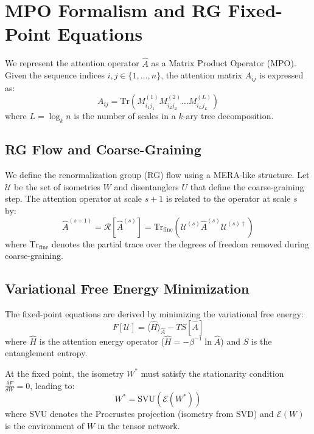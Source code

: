 
\section{MPO Formalism and RG Fixed-Point Equations}

We represent the attention operator $\hat{A}$ as a Matrix Product Operator (MPO). Given the sequence indices $i, j \in \{1, \dots, n\}$, the attention matrix $A_{ij}$ is expressed as:
\begin{equation}
    A_{ij} = \text{Tr} \left( M^{(1)}_{i_1 j_1} M^{(2)}_{i_2 j_2} \dots M^{(L)}_{i_L j_L} \right)
\end{equation}
where $L = \log_k n$ is the number of scales in a $k$-ary tree decomposition.

\subsection{RG Flow and Coarse-Graining}

We define the renormalization group (RG) flow using a MERA-like structure. Let $\mathcal{U}$ be the set of isometries $W$ and disentanglers $U$ that define the coarse-graining step. The attention operator at scale $s+1$ is related to the operator at scale $s$ by:
\begin{equation}
    \hat{A}^{(s+1)} = \mathcal{R}[\hat{A}^{(s)}] = \text{Tr}_{\text{fine}} \left( \mathcal{U}^{(s)} \hat{A}^{(s)} \mathcal{U}^{(s)\dagger} \right)
\end{equation}
where $\text{Tr}_{\text{fine}}$ denotes the partial trace over the degrees of freedom removed during coarse-graining.

\subsection{Variational Free Energy Minimization}

The fixed-point equations are derived by minimizing the variational free energy:
\begin{equation}
    F[\mathcal{U}] = \langle \hat{H} \rangle_{\hat{A}} - T S[\hat{A}]
\end{equation}
where $\hat{H}$ is the attention energy operator ($\hat{H} = -\beta^{-1} \ln \hat{A}$) and $S$ is the entanglement entropy.

At the fixed point, the isometry $W^*$ must satisfy the stationarity condition $\frac{\delta F}{\delta W} = 0$, leading to:
\begin{equation}
    W^* = \text{SVU} \left( \mathcal{E}(W^*) \right)
\end{equation}
where $\text{SVU}$ denotes the Procrustes projection (isometry from SVD) and $\mathcal{E}(W)$ is the environment of $W$ in the tensor network.

